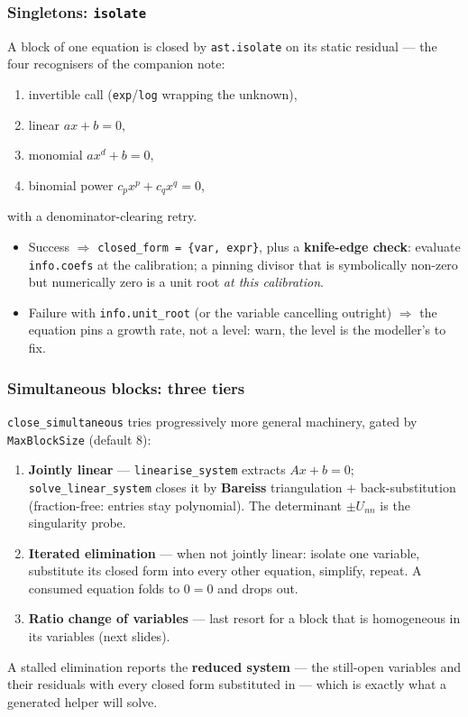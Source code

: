 \documentclass[10pt,slidestop]{beamer}
\newcommand{\code}[1]{\texttt{#1}}
\begin{document}
\begin{frame}\frametitle{Singletons: \texttt{isolate}}
  A block of one equation is closed by \code{ast.isolate} on its static
  residual --- the four recognisers of the companion note:

  \begin{enumerate}\small
  \item invertible call (\code{exp}/\code{log} wrapping the unknown),
  \item linear $a x + b = 0$,
  \item monomial $a x^d + b = 0$,
  \item binomial power $c_p x^p + c_q x^q = 0$,
  \end{enumerate}
  with a denominator-clearing retry.

  \medskip
  \begin{itemize}
  \item Success $\Rightarrow$ \code{closed\_form = \{var, expr\}}, plus a
    \textbf{knife-edge check}: evaluate \code{info.coefs} at the calibration; a
    pinning divisor that is symbolically non-zero but numerically zero is a unit
    root \emph{at this calibration}.\newline
  \item Failure with \code{info.unit\_root} (or the variable cancelling
    outright) $\Rightarrow$ the equation pins a growth rate, not a level: warn,
    the level is the modeller's to fix.
  \end{itemize}
\end{frame}

\begin{frame}\frametitle{Simultaneous blocks: three tiers}
  \code{close\_simultaneous} tries progressively more general machinery, gated
  by \code{MaxBlockSize} (default 8):

  \begin{enumerate}
  \item \textbf{Jointly linear} --- \code{linearise\_system} extracts
    $A x + b = 0$; \code{solve\_linear\_system} closes it by \textbf{Bareiss}
    triangulation $+$ back-substitution (fraction-free: entries stay
    polynomial). The determinant $\pm U_{nn}$ is the singularity probe.\newline
  \item \textbf{Iterated elimination} --- when not jointly linear:
    isolate one variable, substitute its closed form into every other equation,
    simplify, repeat. A consumed equation folds to $0=0$ and drops out.\newline
  \item \textbf{Ratio change of variables} --- last resort for a block that is
    homogeneous in its variables (next slides).
  \end{enumerate}

  \smallskip
  A stalled elimination reports the \textbf{reduced system} --- the still-open
  variables and their residuals with every closed form substituted in --- which
  is exactly what a generated helper will solve.
\end{frame}
\end{document}
